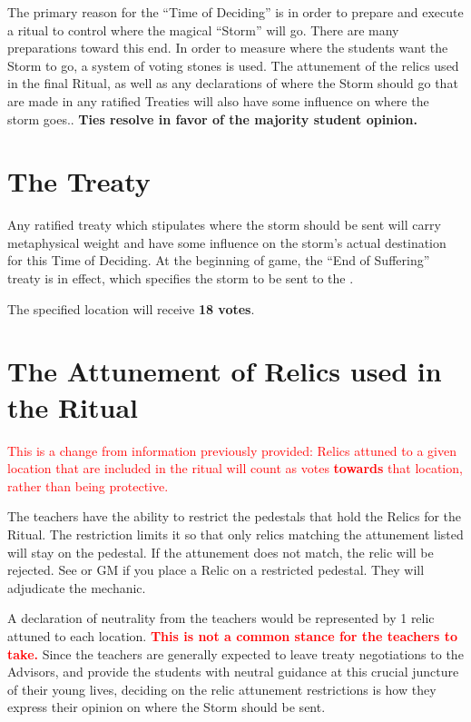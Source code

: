 \documentclass[green]{GL2020}
\begin{document}
\name{\gVotingStones{}}

The primary reason for the ``Time of Deciding'' is in order to prepare and execute a ritual to control where the magical ``Storm'' will go. There are many preparations toward this end. In order to measure where the students want the Storm to go, a system of voting stones is used. The attunement of the relics used in the final Ritual, as well as any declarations of where the Storm should go that are made in any ratified Treaties will also have some influence on where the storm goes.. \textbf{Ties resolve in favor of the majority student opinion.}

\section*{The Treaty}
Any ratified treaty which stipulates where the storm should be sent will carry metaphysical weight and have some influence on the storm's actual destination for this Time of Deciding. At the beginning of game, the ``End of Suffering'' treaty is in effect, which specifies the storm to be sent to the \pShip{}. 

The specified location will receive \textbf{18 votes}.

\section*{The Attunement of Relics used in the Ritual}
\textcolor{red}{This is a change from information previously provided: Relics attuned to a given location that are included in the ritual will count as votes \textbf{towards} that location, rather than being protective.}

The teachers have the ability to restrict the pedestals that hold the Relics for the Ritual. The restriction limits it so that only relics matching the attunement listed will stay on the pedestal. If the attunement does not match, the relic will be rejected. See \cPrincipal{} or GM if you place a Relic on a restricted pedestal. They will adjudicate the mechanic.

A declaration of neutrality from the teachers would be represented by 1 relic attuned to each location. \textcolor{red}{\textbf{This is not a common stance for the teachers to take.}} Since the teachers are generally expected to leave treaty negotiations to the Advisors, and provide the students with neutral guidance at this crucial juncture of their young lives, deciding on the relic attunement restrictions is how they express their opinion on where the Storm should be sent.
\end{document}
